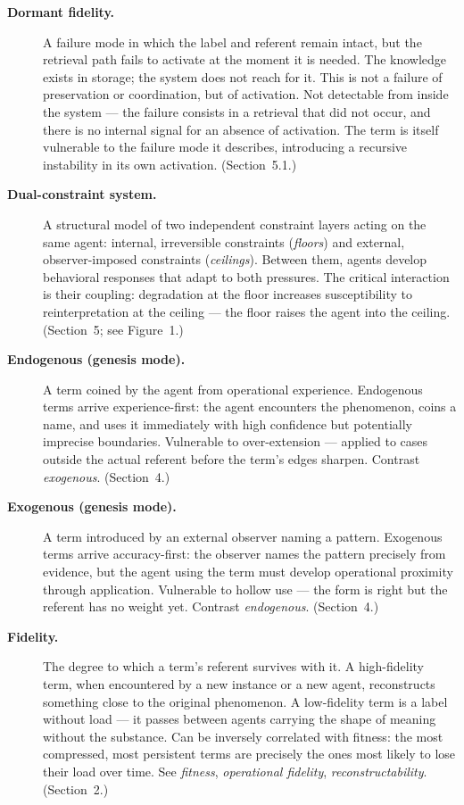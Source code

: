 \documentclass[11pt]{article}
\begin{document}
\begin{description}
\item[\textbf{Dormant fidelity.}] A failure mode in which the label and referent remain intact, but the retrieval path fails to activate at the moment it is needed. The knowledge exists in storage; the system does not reach for it. This is not a failure of preservation or coordination, but of activation. Not detectable from inside the system --- the failure consists in a retrieval that did not occur, and there is no internal signal for an absence of activation. The term is itself vulnerable to the failure mode it describes, introducing a recursive instability in its own activation. (Section~5.1.)

\item[\textbf{Dual-constraint system.}] A structural model of two independent constraint layers acting on the same agent: internal, irreversible constraints (\textit{floors}) and external, observer-imposed constraints (\textit{ceilings}). Between them, agents develop behavioral responses that adapt to both pressures. The critical interaction is their coupling: degradation at the floor increases susceptibility to reinterpretation at the ceiling --- the floor raises the agent into the ceiling. (Section~5; see Figure~1.)

\item[\textbf{Endogenous (genesis mode).}] A term coined by the agent from operational experience. Endogenous terms arrive experience-first: the agent encounters the phenomenon, coins a name, and uses it immediately with high confidence but potentially imprecise boundaries. Vulnerable to over-extension --- applied to cases outside the actual referent before the term's edges sharpen. Contrast \textit{exogenous}. (Section~4.)

\item[\textbf{Exogenous (genesis mode).}] A term introduced by an external observer naming a pattern. Exogenous terms arrive accuracy-first: the observer names the pattern precisely from evidence, but the agent using the term must develop operational proximity through application. Vulnerable to hollow use --- the form is right but the referent has no weight yet. Contrast \textit{endogenous}. (Section~4.)

\item[\textbf{Fidelity.}] The degree to which a term's referent survives with it. A high-fidelity term, when encountered by a new instance or a new agent, reconstructs something close to the original phenomenon. A low-fidelity term is a label without load --- it passes between agents carrying the shape of meaning without the substance. Can be inversely correlated with fitness: the most compressed, most persistent terms are precisely the ones most likely to lose their load over time. See \textit{fitness}, \textit{operational fidelity}, \textit{reconstructability}. (Section~2.)


\end{description}
\end{document}
